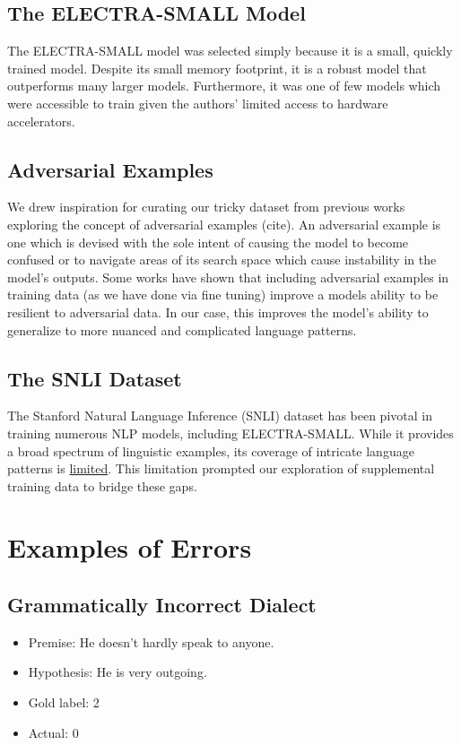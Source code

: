 \documentclass{article}
\begin{document}
\subsection{The ELECTRA-SMALL Model}
The ELECTRA-SMALL model was selected simply because it is a small, quickly trained model. Despite its small memory footprint,
it is a robust model that outperforms many larger models. Furthermore, it was one of few models which were accessible to train
given the authors' limited access to hardware accelerators.

\subsection{Adversarial Examples}
We drew inspiration for curating our tricky dataset from previous works exploring the concept of adversarial examples (cite). An
adversarial example is one which is devised with the sole intent of causing the model to become confused or to navigate
areas of its search space which cause instability in the model's outputs. Some works have shown that including adversarial
examples in training data (as we have done via fine tuning) improve a models ability to be resilient to adversarial data.
In our case, this improves the model's ability to generalize to more nuanced and complicated language patterns.

\subsection{The SNLI Dataset}
The Stanford Natural Language Inference (SNLI) dataset has been pivotal in training numerous NLP models, including ELECTRA-SMALL.
While it provides a broad spectrum of linguistic examples, its coverage of intricate language patterns is \href{https://nlp.stanford.edu/blog/the-stanford-nli-corpus-revisited/}{limited}. This limitation prompted our exploration of supplemental training data to bridge these gaps.


\section{Examples of Errors}
\subsection{Grammatically Incorrect Dialect}
\begin{itemize}
	\item Premise: He doesn’t hardly speak to anyone.
	\item Hypothesis: He is very outgoing.
	\item Gold label: 2
	\item Actual: 0
\end{itemize}
\end{document}
